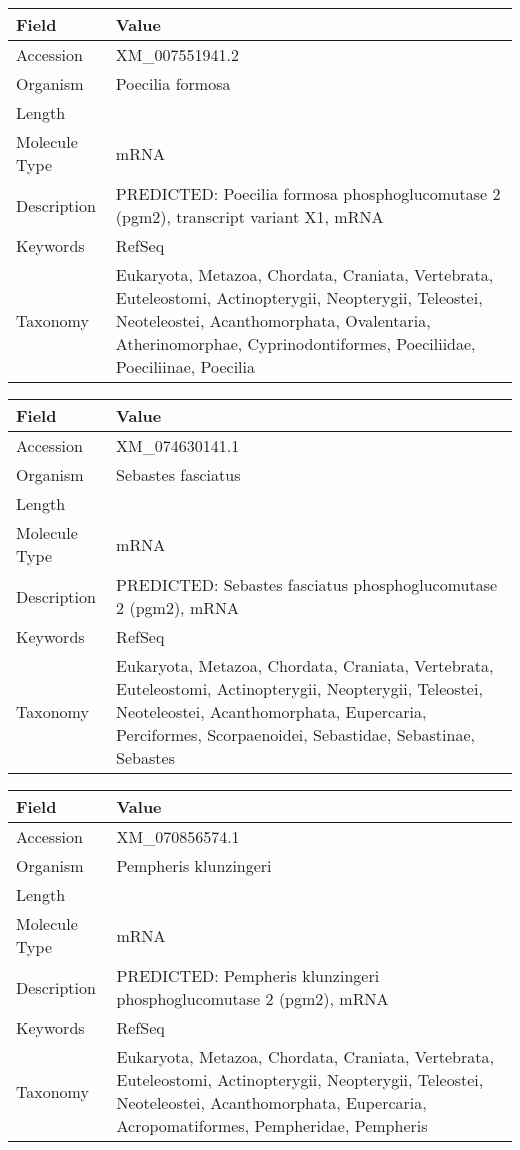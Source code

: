 \documentclass[10pt]{article}
\begin{document}
\vspace{1em}
{\footnotesize
\begin{longtable}{>{\raggedright\arraybackslash}p{4.5cm} >{\raggedright\arraybackslash}p{11.5cm}}
\textbf{Field} & \textbf{Value} \\
\hline
Accession & XM\_007551941.2 \\
Organism & Poecilia formosa \\
Length & 4157 \\
Molecule Type & mRNA \\
Description & PREDICTED: Poecilia formosa phosphoglucomutase 2 (pgm2), transcript variant X1, mRNA \\
Keywords & RefSeq \\
Taxonomy & Eukaryota, Metazoa, Chordata, Craniata, Vertebrata, Euteleostomi, Actinopterygii, Neopterygii, Teleostei, Neoteleostei, Acanthomorphata, Ovalentaria, Atherinomorphae, Cyprinodontiformes, Poeciliidae, Poeciliinae, Poecilia \\
\end{longtable}
}

\vspace{1em}
{\footnotesize
\begin{longtable}{>{\raggedright\arraybackslash}p{4.5cm} >{\raggedright\arraybackslash}p{11.5cm}}
\textbf{Field} & \textbf{Value} \\
\hline
Accession & XM\_074630141.1 \\
Organism & Sebastes fasciatus \\
Length & 2984 \\
Molecule Type & mRNA \\
Description & PREDICTED: Sebastes fasciatus phosphoglucomutase 2 (pgm2), mRNA \\
Keywords & RefSeq \\
Taxonomy & Eukaryota, Metazoa, Chordata, Craniata, Vertebrata, Euteleostomi, Actinopterygii, Neopterygii, Teleostei, Neoteleostei, Acanthomorphata, Eupercaria, Perciformes, Scorpaenoidei, Sebastidae, Sebastinae, Sebastes \\
\end{longtable}
}

\vspace{1em}
{\footnotesize
\begin{longtable}{>{\raggedright\arraybackslash}p{4.5cm} >{\raggedright\arraybackslash}p{11.5cm}}
\textbf{Field} & \textbf{Value} \\
\hline
Accession & XM\_070856574.1 \\
Organism & Pempheris klunzingeri \\
Length & 2771 \\
Molecule Type & mRNA \\
Description & PREDICTED: Pempheris klunzingeri phosphoglucomutase 2 (pgm2), mRNA \\
Keywords & RefSeq \\
Taxonomy & Eukaryota, Metazoa, Chordata, Craniata, Vertebrata, Euteleostomi, Actinopterygii, Neopterygii, Teleostei, Neoteleostei, Acanthomorphata, Eupercaria, Acropomatiformes, Pempheridae, Pempheris \\
\end{longtable}
}
\end{document}
